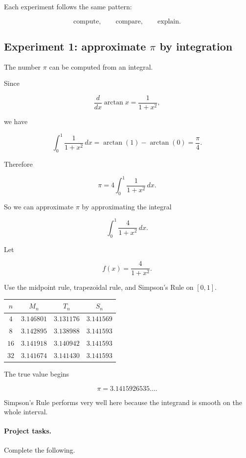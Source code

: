 Each experiment follows the same pattern:

\[
\text{compute},\qquad
\text{compare},\qquad
\text{explain}.
\]

\subsection{Experiment 1: approximate \texorpdfstring{\(\pi\)}{pi} by integration}
\label{subsec:experiment-approximate-pi}

The number \(\pi\) can be computed from an integral.

Since

\[
\frac{d}{dx}\arctan x=\frac{1}{1+x^2},
\]

we have

\[
\int_0^1 \frac{1}{1+x^2}\,dx
=
\arctan(1)-\arctan(0)
=
\frac{\pi}{4}.
\]

Therefore

\[
\boxed{
\pi=4\int_0^1 \frac{1}{1+x^2}\,dx.
}
\]

So we can approximate \(\pi\) by approximating the integral

\[
\int_0^1 \frac{4}{1+x^2}\,dx.
\]

Let

\[
f(x)=\frac{4}{1+x^2}.
\]

Use the midpoint rule, trapezoidal rule, and Simpson's Rule on \([0,1]\).

\begin{center}
\begin{tabular}{c|c|c|c}
\(n\) & \(M_n\) & \(T_n\) & \(S_n\) \\ \hline
\(4\) & \(3.146801\) & \(3.131176\) & \(3.141569\) \\
\(8\) & \(3.142895\) & \(3.138988\) & \(3.141593\) \\
\(16\) & \(3.141918\) & \(3.140942\) & \(3.141593\) \\
\(32\) & \(3.141674\) & \(3.141430\) & \(3.141593\)
\end{tabular}
\end{center}

The true value begins

\[
\pi=3.1415926535\ldots.
\]

Simpson's Rule performs very well here because the integrand is smooth on the whole
interval.

\paragraph{Project tasks.}
Complete the following.

